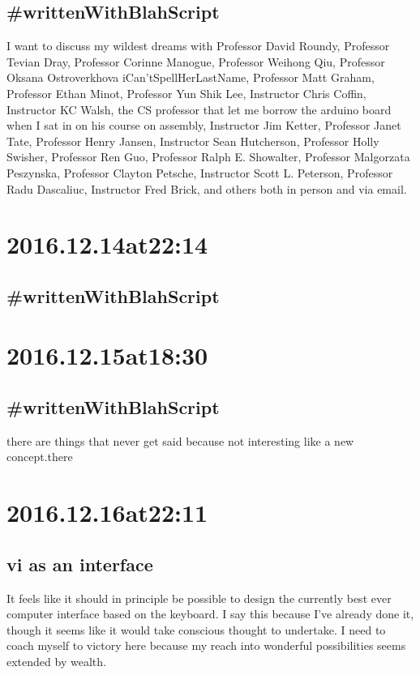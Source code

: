 \begin{enumerate}
\begin{enumerate}
\subsection*{ #writtenWithBlahScript }
I want to discuss my wildest dreams with Professor David Roundy, Professor Tevian Dray, Professor Corinne Manogue, Professor Weihong Qiu, Professor Oksana Ostroverkhova iCan'tSpellHerLastName, Professor Matt Graham, Professor Ethan Minot, Professor Yun Shik Lee, Instructor Chris Coffin, Instructor KC Walsh, the CS professor that let me borrow the arduino board when I sat in on his course on assembly, Instructor Jim Ketter, Professor Janet Tate, Professor Henry Jansen, Instructor Sean Hutcherson, Professor Holly Swisher, Professor Ren Guo, Professor Ralph E. Showalter, Professor Malgorzata Peszynska, Professor Clayton Petsche, Instructor Scott L. Peterson, Professor Radu Dascaliuc, Instructor Fred Brick, and others both in person and via email.

\section*{ 2016.12.14at22:14 }
\subsection*{ #writtenWithBlahScript }


\section*{ 2016.12.15at18:30 }
\subsection*{ #writtenWithBlahScript }
there are things that never get said because not interesting like a new concept.there

\section*{ 2016.12.16at22:11 }
\subsection*{ vi as an interface }
It feels like it should in principle be possible to design the currently best ever computer interface based on the keyboard.  
I say this because I've already done it, though it seems like it would take conscious thought to undertake.
I need to coach myself to victory here because my reach into wonderful possibilities seems extended by wealth.


\end{enumerate}
\end{enumerate}
